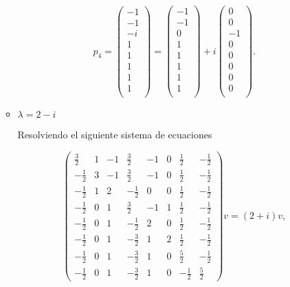 \documentclass[letterpaper]{article}
\theoremstyle{definition}
\theoremstyle{lemathm}
\theoremstyle{lemademthm}
\newcommand{\pars}[1]{\left( #1 \right) }
\newcommand{\1}{\mathbbm{1}}
\begin{document}
\begin{enumerate}
\begin{itemize}
			\[p_4 = \pars{\begin{array}{c}
				-1\\[1ex]
				-1\\[1ex]
				-i\\[1ex]
				1\\[1ex]
				1\\[1ex]
				1\\[1ex]
				1\\[1ex]
				1\\
			\end{array}} = \pars{\begin{array}{c}
				-1\\[1ex]
				-1\\[1ex]
				0\\[1ex]
				1\\[1ex]
				1\\[1ex]
				1\\[1ex]
				1\\[1ex]
				1\\
			\end{array}} + i\pars{\begin{array}{c}
				0\\[1ex]
				0\\[1ex]
				-1\\[1ex]
				0\\[1ex]
				0\\[1ex]
				0\\[1ex]
				0\\[1ex]
				0\\
			\end{array}}.\]

			\item $\lambda = 2-i$
			
			Resolviendo el siguiente sistema de ecuaciones
			
			\[\pars{\begin{array}{cccccccc} \frac{3}{2} & 1 & -1 & \frac{3}{2} & -1 & 0 & \frac{1}{2} & -\frac{1}{2} \\[1ex] -\frac{1}{2} & 3 & -1 & \frac{3}{2} & -1 & 0 & \frac{1}{2} & -\frac{1}{2} \\[1ex] -\frac{1}{2} & 1 & 2 & -\frac{1}{2} & 0 & 0 & \frac{1}{2} & -\frac{1}{2} \\[1ex] -\frac{1}{2} & 0 & 1 & \frac{3}{2} & -1 & 1 & \frac{1}{2} & -\frac{1}{2} \\[1ex] -\frac{1}{2} & 0 & 1 & -\frac{1}{2} & 2 & 0 & \frac{1}{2} & -\frac{1}{2} \\[1ex] -\frac{1}{2} & 0 & 1 & -\frac{3}{2} & 1 & 2 & \frac{1}{2} & -\frac{1}{2} \\[1ex] -\frac{1}{2} & 0 & 1 & -\frac{3}{2} & 1 & 0 & \frac{5}{2} & -\frac{1}{2} \\[1ex] -\frac{1}{2} & 0 & 1 & -\frac{3}{2} & 1 & 0 & -\frac{1}{2} & \frac{5}{2} \end{array}} v = (2+i) v,\]


\end{itemize}
\end{enumerate}
\end{document}
